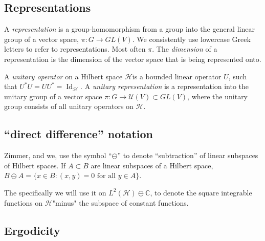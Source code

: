 \documentclass[
  12pt
]{article}
\theoremstyle{break}
\newtheorem{defn}{Definition}
\theoremstyle{plain}
\newcommand{\bbc}{\ensuremath{\mathbb{C}}}
\newcommand{\hilb}{\ensuremath{\mathscr{H}}}
\DeclareMathOperator{\Id}{Id}
\begin{document}
  \hypertarget{representations}{%
  \subsection{Representations}\label{representations}}


  A \emph{representation} is a group-homomorphism from a group into the general linear
  group of a vector space, $\pi: G \rightarrow GL(V)$.
  We consistently use lowercase Greek letters to refer to representations.
  Most often $\pi$.
  The \emph{dimension} of a representation is the dimension of the vector space
  that is being represented onto.


  A \emph{unitary operator} on a Hilbert space \hilb is a bounded linear
  operator $U$, such that $U^*U= UU^* = \Id_{\hilb}$. A \emph{unitary
  representation} is a representation into the unitary group of a vector space
  $\pi: G \rightarrow \mathcal{U}(V) \subset GL(V)$, where the unitary group
  consists of all unitary operators on \hilb.






  \hypertarget{direct-difference-notation}{%
  \subsection{``direct difference''
  notation}\label{direct-difference-notation}}

  Zimmer, and we, use the symbol ``$\ominus$'' to denote ``subtraction''
  of linear subspaces of Hilbert spaces. If $A \subset B$ are linear
  subspaces of a Hilbert space,
  $B \ominus A = \{x \in B: (x,y) = 0 \text{ for all }y \in A\}$.

  The specifically we will use it on $L^2(\hilb) \ominus \bbc$, to denote
  the square integrable functions on \hilb "minus" the subspace of constant functions.


  \hypertarget{ergodicity}{%
  \subsection{Ergodicity}\label{ergodicity}}

\end{document}
